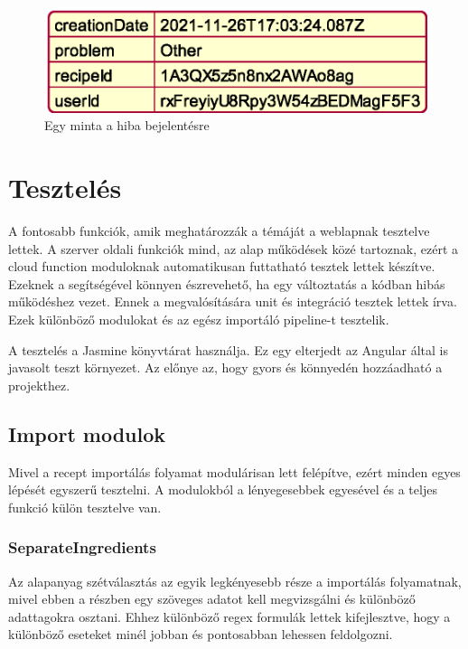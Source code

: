 \documentclass[12pt]{report}
\theoremstyle{definition}
\begin{document}
\noindent
\begin{figure}[H]
	\centering
	\includegraphics[scale=0.6]{out/diagrams/jsonReports/jsonReports.eps}
	\caption{Egy minta a hiba bejelentésre}
    \label{fig:jsonReports}
\end{figure}


\chapter{Tesztelés}
A fontosabb funkciók, amik meghatározzák a témáját a weblapnak tesztelve lettek. A szerver oldali funkciók mind, az alap működések közé tartoznak, ezért a cloud function moduloknak automatikusan futtatható tesztek lettek készítve. Ezeknek a segítségével könnyen észrevehető, ha egy változtatás a kódban hibás működéshez vezet. Ennek a megvalósítására unit és integráció tesztek lettek írva. Ezek különböző modulokat és az egész importáló pipeline-t tesztelik.

A tesztelés a Jasmine könyvtárat használja. Ez egy elterjedt az Angular által is javasolt teszt környezet. Az előnye az, hogy gyors és könnyedén hozzáadható a projekthez. 

\section{Import modulok}
Mivel a recept importálás folyamat modulárisan lett felépítve, ezért minden egyes lépését egyszerű tesztelni. A modulokból a lényegesebbek egyesével és a teljes funkció külön tesztelve van.

\subsection{SeparateIngredients}
Az alapanyag szétválasztás az egyik legkényesebb része a importálás folyamatnak, mivel ebben a részben egy szöveges adatot kell megvizsgálni és különböző adattagokra osztani. Ehhez különböző \Gls{regex} formulák lettek kifejlesztve, hogy a különböző eseteket minél jobban és pontosabban lehessen feldolgozni.
 
\end{document}
